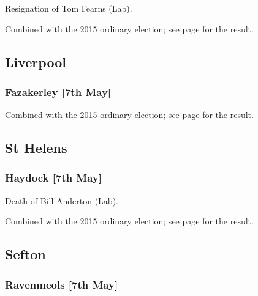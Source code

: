 \documentclass[a4paper,openany]{book}
\begin{document}
\begin{resultsiii}

Resignation of Tom Fearns (Lab).

Combined with the 2015 ordinary election; see page \pageref{HalewoodWestKnowsley} for the result.

\subsection*{Liverpool}

\subsubsection*{Fazakerley \hspace*{\fill}\nolinebreak[1]%
\enspace\hspace*{\fill}
[7th May]}



Combined with the 2015 ordinary election; see page \pageref{FazakerleyLiverpool} for the result.

\subsection*{St Helens}

\subsubsection*{Haydock \hspace*{\fill}\nolinebreak[1]%
\enspace\hspace*{\fill}
[7th May]}


Death of Bill Anderton (Lab).

Combined with the 2015 ordinary election; see page \pageref{HaydockStHelens} for the result.

\subsection*{Sefton}

\subsubsection*{Ravenmeols \hspace*{\fill}\nolinebreak[1]%
\enspace\hspace*{\fill}
[7th May]}


\end{resultsiii}
\end{document}
